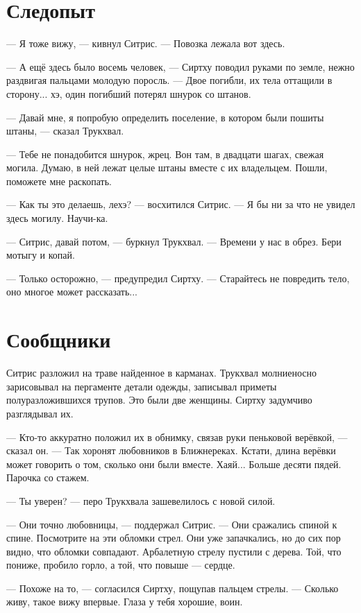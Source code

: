 \section{Следопыт}

--- Я тоже вижу, --- кивнул Ситрис.
--- Повозка лежала вот здесь.

--- А ещё здесь было восемь человек, --- Сиртху поводил руками по земле, нежно раздвигая пальцами молодую поросль.
--- Двое погибли, их тела оттащили в сторону... хэ, один погибший потерял шнурок со штанов.

--- Давай мне, я попробую определить поселение, в котором были пошиты штаны, --- сказал Трукхвал.

--- Тебе не понадобится шнурок, жрец.
Вон там, в двадцати шагах, свежая могила.
Думаю, в ней лежат целые штаны вместе с их владельцем.
Пошли, поможете мне раскопать.

--- Как ты это делаешь, лехэ? --- восхитился Ситрис.
--- Я бы ни за что не увидел здесь могилу.
Научи-ка.

--- Ситрис, давай потом, --- буркнул Трукхвал.
--- Времени у нас в обрез.
Бери мотыгу и копай.

--- Только осторожно, --- предупредил Сиртху.
--- Старайтесь не повредить тело, оно многое может рассказать...

\section{Сообщники}

Ситрис разложил на траве найденное в карманах.
Трукхвал молниеносно зарисовывал на пергаменте детали одежды, записывал приметы полуразложившихся трупов.
Это были две женщины.
Сиртху задумчиво разглядывал их.

--- Кто-то аккуратно положил их в обнимку, связав руки пеньковой верёвкой, --- сказал он.
--- Так хоронят любовников в Ближнереках.
Кстати, длина верёвки может говорить о том, сколько они были вместе.
Хаяй...
Больше десяти пядей.
Парочка со стажем.

--- Ты уверен? --- перо Трукхвала зашевелилось с новой силой.

--- Они точно любовницы, --- поддержал Ситрис.
--- Они сражались спиной к спине.
Посмотрите на эти обломки стрел.
Они уже запачкались, но до сих пор видно, что обломки совпадают.
Арбалетную стрелу пустили с дерева.
Той, что пониже, пробило горло, а той, что повыше --- сердце.

--- Похоже на то, --- согласился Сиртху, пощупав пальцем стрелы.
--- Сколько живу, такое вижу впервые.
Глаза у тебя хорошие, воин.


